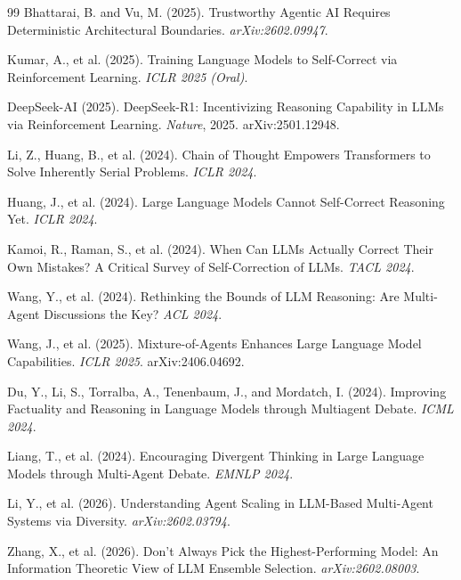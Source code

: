 \documentclass[11pt,a4paper]{article}
\theoremstyle{remark}
\begin{document}
\begin{thebibliography}{99}
Bhattarai, B. and Vu, M. (2025).
\newblock Trustworthy Agentic AI Requires Deterministic Architectural Boundaries.
\newblock \emph{arXiv:2602.09947}.

Kumar, A., et al. (2025).
\newblock Training Language Models to Self-Correct via Reinforcement Learning.
\newblock \emph{ICLR 2025 (Oral)}.

DeepSeek-AI (2025).
\newblock DeepSeek-R1: Incentivizing Reasoning Capability in LLMs via Reinforcement Learning.
\newblock \emph{Nature}, 2025. arXiv:2501.12948.

Li, Z., Huang, B., et al. (2024).
\newblock Chain of Thought Empowers Transformers to Solve Inherently Serial Problems.
\newblock \emph{ICLR 2024}.

Huang, J., et al. (2024).
\newblock Large Language Models Cannot Self-Correct Reasoning Yet.
\newblock \emph{ICLR 2024}.

Kamoi, R., Raman, S., et al. (2024).
\newblock When Can LLMs Actually Correct Their Own Mistakes? A Critical Survey of Self-Correction of LLMs.
\newblock \emph{TACL 2024}.

Wang, Y., et al. (2024).
\newblock Rethinking the Bounds of LLM Reasoning: Are Multi-Agent Discussions the Key?
\newblock \emph{ACL 2024}.

Wang, J., et al. (2025).
\newblock Mixture-of-Agents Enhances Large Language Model Capabilities.
\newblock \emph{ICLR 2025}. arXiv:2406.04692.

Du, Y., Li, S., Torralba, A., Tenenbaum, J., and Mordatch, I. (2024).
\newblock Improving Factuality and Reasoning in Language Models through Multiagent Debate.
\newblock \emph{ICML 2024}.

Liang, T., et al. (2024).
\newblock Encouraging Divergent Thinking in Large Language Models through Multi-Agent Debate.
\newblock \emph{EMNLP 2024}.

Li, Y., et al. (2026).
\newblock Understanding Agent Scaling in LLM-Based Multi-Agent Systems via Diversity.
\newblock \emph{arXiv:2602.03794}.

Zhang, X., et al. (2026).
\newblock Don't Always Pick the Highest-Performing Model: An Information Theoretic View of LLM Ensemble Selection.
\newblock \emph{arXiv:2602.08003}.

\end{thebibliography}
\end{document}
